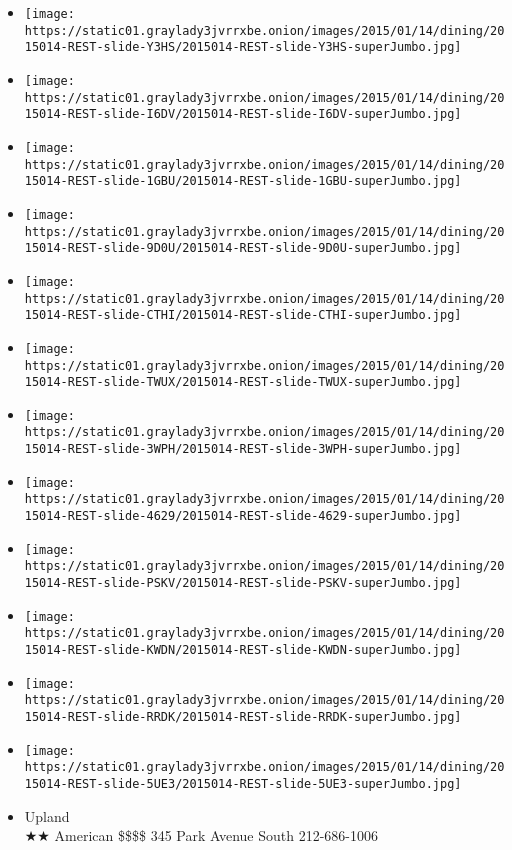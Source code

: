 \begin{itemize}
\item
  \texttt{[image: https://static01.graylady3jvrrxbe.onion/images/2015/01/14/dining/2015014-REST-slide-Y3HS/2015014-REST-slide-Y3HS-superJumbo.jpg]}
\item
  \texttt{[image: https://static01.graylady3jvrrxbe.onion/images/2015/01/14/dining/2015014-REST-slide-I6DV/2015014-REST-slide-I6DV-superJumbo.jpg]}
\item
  \texttt{[image: https://static01.graylady3jvrrxbe.onion/images/2015/01/14/dining/2015014-REST-slide-1GBU/2015014-REST-slide-1GBU-superJumbo.jpg]}
\item
  \texttt{[image: https://static01.graylady3jvrrxbe.onion/images/2015/01/14/dining/2015014-REST-slide-9D0U/2015014-REST-slide-9D0U-superJumbo.jpg]}
\item
  \texttt{[image: https://static01.graylady3jvrrxbe.onion/images/2015/01/14/dining/2015014-REST-slide-CTHI/2015014-REST-slide-CTHI-superJumbo.jpg]}
\item
  \texttt{[image: https://static01.graylady3jvrrxbe.onion/images/2015/01/14/dining/2015014-REST-slide-TWUX/2015014-REST-slide-TWUX-superJumbo.jpg]}
\item
  \texttt{[image: https://static01.graylady3jvrrxbe.onion/images/2015/01/14/dining/2015014-REST-slide-3WPH/2015014-REST-slide-3WPH-superJumbo.jpg]}
\item
  \texttt{[image: https://static01.graylady3jvrrxbe.onion/images/2015/01/14/dining/2015014-REST-slide-4629/2015014-REST-slide-4629-superJumbo.jpg]}
\item
  \texttt{[image: https://static01.graylady3jvrrxbe.onion/images/2015/01/14/dining/2015014-REST-slide-PSKV/2015014-REST-slide-PSKV-superJumbo.jpg]}
\item
  \texttt{[image: https://static01.graylady3jvrrxbe.onion/images/2015/01/14/dining/2015014-REST-slide-KWDN/2015014-REST-slide-KWDN-superJumbo.jpg]}
\item
  \texttt{[image: https://static01.graylady3jvrrxbe.onion/images/2015/01/14/dining/2015014-REST-slide-RRDK/2015014-REST-slide-RRDK-superJumbo.jpg]}
\item
  \texttt{[image: https://static01.graylady3jvrrxbe.onion/images/2015/01/14/dining/2015014-REST-slide-5UE3/2015014-REST-slide-5UE3-superJumbo.jpg]}
\end{itemize}

\begin{itemize}
\tightlist
\item
  Upland\\
  ★★ American \$\$\$\$ 345 Park Avenue South 212-686-1006
\end{itemize}

